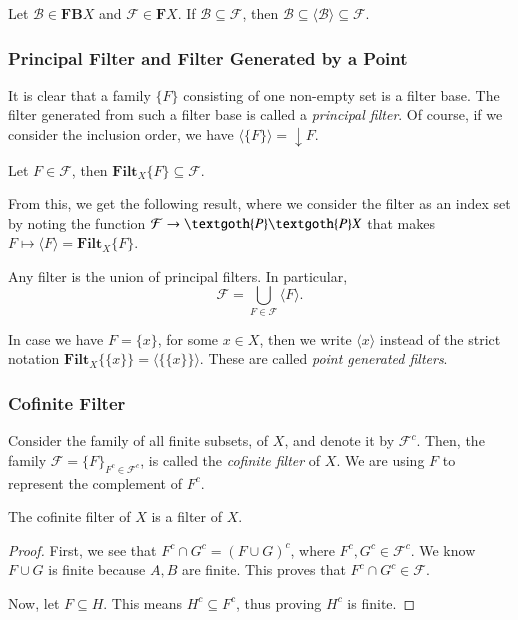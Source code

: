 \documentclass [12pt]{book}
\begin{document}
\begin{proposition}Let $\mathcal{B}\in\textbf{FB}X$ and $\mathcal{F}\in\textbf{F}X$. If $\mathcal{B}\subseteq\mathcal{F}$, then $\mathcal{B}\subseteq\langle\mathcal{B}\rangle\subseteq\mathcal{F}$.\end{proposition}

		\subsubsection{Principal Filter and Filter Generated by a Point}

It is clear that a family $\{F\}$ consisting of one non-empty set is a filter base. The filter generated from such a filter base is called a \textit{principal filter}. Of course, if we consider the inclusion order, we have $\langle\{F\}\rangle=\downarrow F$.

\begin{lemma4.1}Let $F\in\mathcal{F}$, then $\textbf{Filt}_X\{F\}\subseteq\mathcal{F}$.\end{lemma4.1}

From this, we get the following result, where we consider the filter as an index set by noting the function $\mathcal{F}\rightarrow\textgoth{P}\textgoth{P}X$ that makes $F\mapsto \langle F\rangle=\textbf{Filt}_X{\{F\}}$.

\begin{theorem}Any filter is the union of principal filters. In particular,$$\mathcal{F}=\bigcup_{F\in\mathcal{F}}\langle F\rangle.$$\end{theorem}

In case we have $F=\{x\}$, for some $x\in X$, then we write $\langle x\rangle$ instead of the strict notation $\textbf{Filt}_X\{\{x\}\}=\langle\{\{x\}\}\rangle$. These are called \textit{point generated filters}.

\subsubsection{Cofinite Filter} Consider the family of all finite subsets, of $X$, and denote it by $\mathcal{F}^c$. Then, the family $\mathcal{F}=\{F\}_{F^c\in\mathcal{F}^c}$, is called the \textit{cofinite filter} of $X$. We are using $F$ to represent the complement of $F^c$.

\begin{proposition}The cofinite filter of $X$ is a filter of $X$.\end{proposition}

\begin{proof}First, we see that $F^c\cap G^c=(F\cup G)^c$, where $F^c,G^c\in\mathcal{F}^c$. We know $F\cup G$ is finite because $A,B$ are finite. This proves that $F^c\cap G^c\in\mathcal{F}$.

Now, let $F\subseteq H$. This means $H^c\subseteq F^c$, thus proving $H^c$ is finite.\end{proof}
\end{document}
